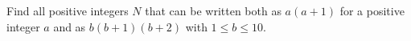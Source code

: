 Find all positive integers $N$ that can be written both as $a(a+1)$ for a positive integer $a$ and as $b(b+1)(b+2)$ with $1\le b\le10$.
